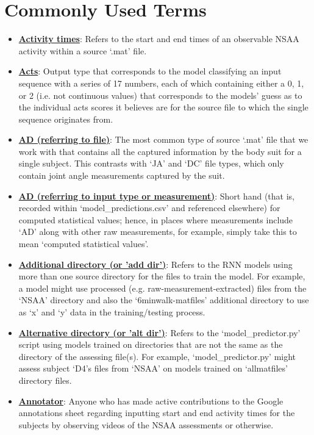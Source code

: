\documentclass[12pt,twoside]{report}
\begin{document}
\section{Commonly Used Terms}

\begin{itemize}
	\item \underline{\textbf{Activity times}}: Refers to the start and end times of an observable NSAA activity within a source ‘.mat’ file.
	\item \underline{\textbf{Acts}}: Output type that corresponds to the model classifying an input sequence with a series of 17 numbers, each of which containing either a 0, 1, or 2 (i.e. not continuous values) that corresponds to the models’ guess as to the individual acts scores it believes are for the source file to which the single sequence originates from.
	\item \underline{\textbf{AD (referring to file)}}: The most common type of source ‘.mat’ file that we work with that contains all the captured information by the body suit for a single subject. This contrasts with ‘JA’ and ‘DC’ file types, which only contain joint angle measurements captured by the suit.
	\item \underline{\textbf{AD (referring to input type or measurement)}}: Short hand (that is, recorded within ‘model\_predictions.csv’ and referenced elsewhere) for computed statistical values; hence, in places where measurements include ‘AD’ along with other raw measurements, for example, simply take this to mean ‘computed statistical values’.
	\item \underline{\textbf{Additional directory (or 'add dir')}}: Refers to the RNN models using more than one source directory for the files to train the model. For example, a model might use processed (e.g. raw-measurement-extracted) files from the ‘NSAA’ directory and also the ‘6minwalk-matfiles’ additional directory to use as ‘x’ and ‘y’ data in the training/testing process. 
	\item \underline{\textbf{Alternative directory (or 'alt dir')}}: Refers to the ‘model\_predictor.py’ script using models trained on directories that are not the same as the directory of the assessing file(s). For example, ‘model\_predictor.py’ might assess subject ‘D4’s files from ‘NSAA’ on models trained on ‘allmatfiles’ directory files.
	\item \underline{\textbf{Annotator}}: Anyone who has made active contributions to the Google annotations sheet regarding inputting start and end activity times for the subjects by observing videos of the NSAA assessments or otherwise.

\end{itemize}
\end{document}
